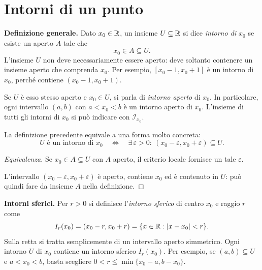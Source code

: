 \section{Intorni di un punto}

\textbf{Definizione generale.} Dato $x_0\in\mathbb{R}$, un insieme $U\subseteq\mathbb{R}$ si dice \emph{intorno di $x_0$} se esiste un aperto $A$ tale che
\[
  x_0\in A\subseteq U.
\]
L'insieme $U$ non deve necessariamente essere aperto: deve soltanto contenere un insieme aperto che comprenda $x_0$. Per esempio, $[x_0-1,x_0+1]$ è un intorno di $x_0$, perché contiene $(x_0-1,x_0+1)$.

Se $U$ è esso stesso aperto e $x_0\in U$, si parla di \emph{intorno aperto} di $x_0$. In particolare, ogni intervallo $(a,b)$ con $a<x_0<b$ è un intorno aperto di $x_0$. L'insieme di tutti gli intorni di $x_0$ si può indicare con $\mathcal I_{x_0}$.

La definizione precedente equivale a una forma molto concreta:
\[
  U\text{ è un intorno di }x_0
  \quad\Longleftrightarrow\quad
  \exists\,\varepsilon>0:\ (x_0-\varepsilon,x_0+\varepsilon)\subseteq U.
\]
\begin{proof}[Equivalenza]
\passomath{\Rightarrow} Se $x_0\in A\subseteq U$ con $A$ aperto, il criterio locale fornisce un tale $\varepsilon$.

\passomath{\Leftarrow} L'intervallo $(x_0-\varepsilon,x_0+\varepsilon)$ è aperto, contiene $x_0$ ed è contenuto in $U$: può quindi fare da insieme $A$ nella definizione.
\end{proof}

\textbf{Intorni sferici.} Per $r>0$ si definisce l'\emph{intorno sferico} di centro $x_0$ e raggio $r$ come
\[
  I_r(x_0)=(x_0-r,x_0+r)
  =\{x\in\mathbb{R}:|x-x_0|<r\}.
\]
Sulla retta si tratta semplicemente di un intervallo aperto simmetrico. Ogni intorno $U$ di $x_0$ contiene un intorno sferico $I_r(x_0)$. Per esempio, se $(a,b)\subseteq U$ e $a<x_0<b$, basta scegliere $0<r\le\min\{x_0-a,b-x_0\}$.

